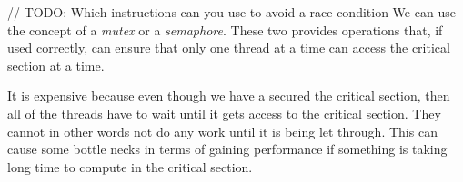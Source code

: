\documentclass[11pt]{article}
\newcommand{\temp}[1]{{\color{red}#1}}
\begin{document}
\temp{// TODO: Which instructions can you use to avoid a race-condition}
We can use the concept of a \textit{mutex} or a \textit{semaphore}. These two provides operations that, if used correctly, can ensure that 
only one thread at a time can access the critical section at a time. 

It is expensive because even though we have a secured the critical section, then all of the threads have to wait until it gets access to
the critical section. They cannot in other words not do any work until it is being let through. This can cause some bottle necks in terms of 
gaining performance if something is taking long time to compute in the critical section.


\end{document}
